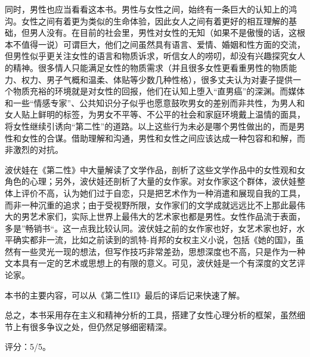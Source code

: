 同时，男性也应当看看这本书。男性与女性之间，始终有一条巨大的认知上的鸿沟。女性之间有着更为类似的生命体验，因此女人之间有着更好的相互理解的基础，但男人没有。在目前的社会里，男性对女性的无知（如果不是傲慢的话，这根本不值得一说）可谓巨大，他们之间虽然具有语言、爱情、婚姻和性方面的交流，但男性似乎更关注女性的语言和物质诉求，听信女人的唠叨，却没有兴趣探究女人的精神。很多情人只能满足女性的物质需求（并且很多女性更看重男性的物质能力、权力、男子气概和温柔、体贴等少数几种性格），很多丈夫认为对妻子提供一个物质充裕的环境就是对女性的回报，他们在认知上堕入“直男癌”的深渊。而媒体和一些“情感专家”、公共知识分子似乎也愿意鼓吹男女的差别而非共性，为男人和女人贴上鲜明的标签，为男女不平等、不公平的社会和家庭环境戴上温情的面具，将女性继续引诱向“第二性”的道路。以上这些行为未必是哪个男性做出的，而是男性和女性的合谋。借助理解和沟通，男性和女性之间应该达成一种包容和和解，而非激烈的对抗。

波伏娃在《第二性》中大量解读了文学作品，剖析了这些文学作品中的女性观和女角色的心理；另外，波伏娃还剖析了大量的女作家。对女作家这个群体，波伏娃整体上评价不高，认为她们过于自恋，只是把艺术作为一种消遣和展现自我的工具，而非一种沉重的追求；由于受视野所限，女作家们的文学成就远远比不上那此最伟大的男艺术家们，实际上世界上最伟大的艺术家也都是男性。女性作品流于表面，多是”畅销书“。这一点我比较认同。波伏娃之前的女作家也好，女艺术家也好，水平确实都非一流，比如之前读到的凯特-肖邦的女权主义小说，包括《她的国》，虽然有一些灵光一现的想法，但写作技巧非常差劲，思想深度也不高，只是作为一种文本具有一定的艺术或思想上的有限的意义。可见，波伏娃是一个有深度的文艺评论家。

本书的主要内容，可以从《第二性II》最后的译后记来快速了解。

总之，本书采用存在主义和精神分析的工具，搭建了女性心理分析的框架，虽然细节上有很多争议之处，但仍然足够细密精深。

评分：5/5。